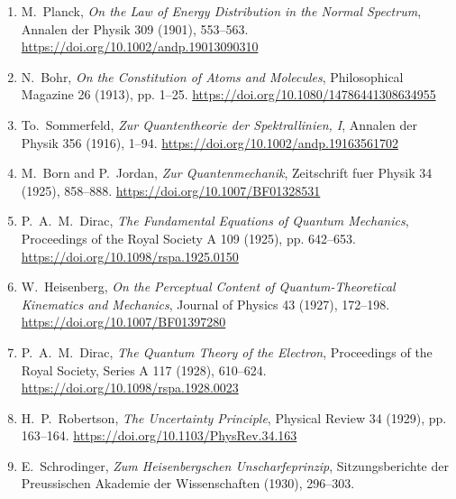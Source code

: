 \begin{enumerate}
\renewcommand{\labelenumi}{[\arabic{enumi}]}
\item\hypertarget{radionbib:Planck1901}{}
M.~Planck,
\emph{On the Law of Energy Distribution in the Normal Spectrum},
Annalen der Physik 309 (1901), 553--563.
\url{https://doi.org/10.1002/andp.19013090310}

\item\hypertarget{radionbib:Bohr1913}{}
N.~Bohr,
\emph{On the Constitution of Atoms and Molecules},
Philosophical Magazine 26 (1913), pp. 1--25.
\url{https://doi.org/10.1080/14786441308634955}

\item\hypertarget{radionbib:Sommerfeld1916}{}
To.~Sommerfeld,
\emph{Zur Quantentheorie der Spektrallinien, I},
Annalen der Physik 356 (1916), 1--94.
\url{https://doi.org/10.1002/andp.19163561702}

\item\hypertarget{radionbib:BornJordan1925}{}
M.~Born and P.~Jordan,
\emph{Zur Quantenmechanik},
Zeitschrift fuer Physik 34 (1925), 858--888.
\url{https://doi.org/10.1007/BF01328531}

\item\hypertarget{radionbib:Dirac1925}{}
P.~A.~M.~Dirac,
\emph{The Fundamental Equations of Quantum Mechanics},
Proceedings of the Royal Society A 109 (1925), pp. 642--653.
\url{https://doi.org/10.1098/rspa.1925.0150}

\item\hypertarget{radionbib:Heisenberg1927}{}
W.~Heisenberg,
\emph{On the Perceptual Content of Quantum-Theoretical Kinematics and Mechanics},
Journal of Physics 43 (1927), 172--198.
\url{https://doi.org/10.1007/BF01397280}

\item\hypertarget{radionbib:Dirac1928}{}
P.~A.~M.~Dirac,
\emph{The Quantum Theory of the Electron},
Proceedings of the Royal Society, Series A 117 (1928), 610--624.
\url{https://doi.org/10.1098/rspa.1928.0023}

\item\hypertarget{radionbib:Robertson1929}{}
H.~P.~Robertson,
\emph{The Uncertainty Principle},
Physical Review 34 (1929), pp. 163--164.
\url{https://doi.org/10.1103/PhysRev.34.163}

\item\hypertarget{radionbib:Schrodinger1930}{}
E.~Schrodinger,
\emph{Zum Heisenbergschen Unscharfeprinzip},
Sitzungsberichte der Preussischen Akademie der Wissenschaften (1930), 296--303.


\end{enumerate}
